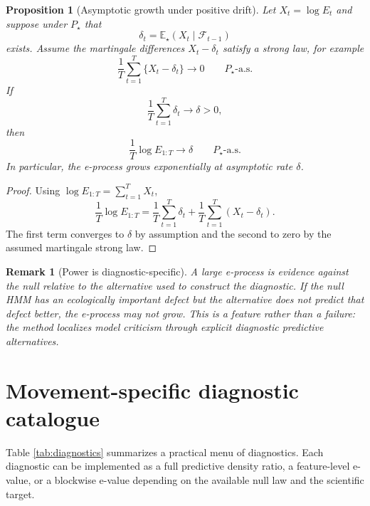 \documentclass[pdflatex,sn-basic]{sn-jnl}
\theoremstyle{thmstyleone}
\newtheorem{proposition}[theorem]{Proposition}
\theoremstyle{thmstyletwo}
\newtheorem{remark}{Remark}
\theoremstyle{thmstylethree}
\newcommand{\E}{\mathbb E}
\newcommand{\1}{\mathbf 1}
\newcommand{\calF}{\mathcal F}
\begin{document}
\begin{proposition}[Asymptotic growth under positive drift]
\label{prop:growth}
Let $X_t=\log E_t$ and suppose under $P_\star$ that
\begin{equation}
 \delta_t=\E_\star(X_t\mid\calF_{t-1})
\end{equation}
exists. Assume the martingale differences $X_t-\delta_t$ satisfy a strong law, for example
\begin{equation}
 \frac{1}{T}\sum_{t=1}^T\{X_t-\delta_t\}\to0\qquad P_\star\text{-a.s.}
\end{equation}
If
\begin{equation}
 \frac{1}{T}\sum_{t=1}^T\delta_t\to\delta>0,
\end{equation}
then
\begin{equation}
 \frac{1}{T}\log E_{1:T}\to\delta\qquad P_\star\text{-a.s.}
\end{equation}
In particular, the e-process grows exponentially at asymptotic rate $\delta$.
\end{proposition}

\begin{proof}
Using $\log E_{1:T}=\sum_{t=1}^TX_t$,
\begin{equation}
 \frac{1}{T}\log E_{1:T}=\frac{1}{T}\sum_{t=1}^T\delta_t+\frac{1}{T}\sum_{t=1}^T(X_t-\delta_t).
\end{equation}
The first term converges to $\delta$ by assumption and the second to zero by the assumed martingale strong law.
\end{proof}

\begin{remark}[Power is diagnostic-specific]
A large e-process is evidence against the null relative to the alternative used to construct the diagnostic. If the null HMM has an ecologically important defect but the alternative does not predict that defect better, the e-process may not grow. This is a feature rather than a failure: the method localizes model criticism through explicit diagnostic predictive alternatives.
\end{remark}

\section{Movement-specific diagnostic catalogue}
\label{sec:catalogue}

Table \ref{tab:diagnostics} summarizes a practical menu of diagnostics. Each diagnostic can be implemented as a full predictive density ratio, a feature-level e-value, or a blockwise e-value depending on the available null law and the scientific target.
\end{document}
